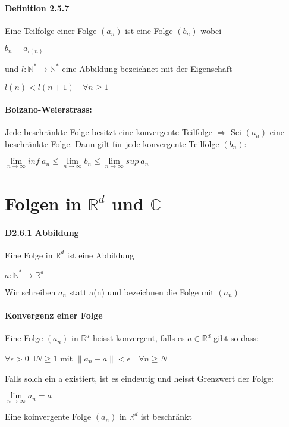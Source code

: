 \documentclass[8pt]{extreport}
\begin{document}
\paragraph{Definition 2.5.7} Eine Teilfolge einer Folge $(a_{n})$ ist eine Folge $(b_{n})$ wobei
\begin{center}
$b_{n} = a_{l(n)}$
\end{center}
und $l: \mathbb{N}^* \rightarrow \mathbb{N}^*$ eine Abbildung bezeichnet mit der Eigenschaft
\begin{center}
$l(n) < l(n+1) \quad \forall n \geq 1$ 
\end{center}
\paragraph{Bolzano-Weierstrass:} Jede beschränkte Folge besitzt eine konvergente Teilfolge
$\Rightarrow$ Sei $(a_{n})$ eine beschränkte Folge. Dann gilt für jede konvergente Teilfolge $(b_{n})$:
\begin{center}
$\lim\limits_{n \to \infty} inf \  a_{n} \leq \lim\limits_{n \to \infty} b_{n} \leq \lim\limits_{n\to \infty} sup \ a_{n}$
\end{center}
\section{Folgen in $\mathbb{R}^d$ und $\mathbb{C}$}
\paragraph{D2.6.1 Abbildung} Eine Folge in $\mathbb{R}^d$ ist eine Abbildung
\begin{center}
$a:\mathbb{N}^* \rightarrow \mathbb {R}^d$
\end{center}
Wir schreiben $a_{n}$ statt a(n) und bezeichnen die Folge mit $(a_{n})$
\paragraph{Konvergenz einer Folge} Eine Folge $(a_{n})$ in $\mathbb{R}^d$ heisst konvergent, falls es $a \in \mathbb{R}^d$ gibt so dass:
\begin{center}
$\forall \epsilon > 0 \ \exists N \geq 1$ mit $\parallel a_{n} - a \parallel < \epsilon \quad \forall n \geq N$
\end{center}
Falls solch ein a existiert, ist es eindeutig und heisst Grenzwert der Folge:
\begin{center}
$\lim\limits_{n \to \infty} a_{n} = a$
\end{center}
Eine koinvergente Folge $(a_{n})$ in $\mathbb{R}^d$ ist beschränkt
\end{document}
